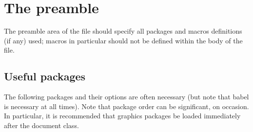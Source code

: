 \section{The preamble}

The preamble area of the file should specify all packages and macros
definitions (if any) used; macros in particular should not be defined
within the body of the file.


\subsection{Useful packages}

The following packages and their options are often necessary (but note
that \textsf{babel} is necessary at all times). Note that package
order can be significant, on occasion. In particular, it is
recommended that graphics packages be loaded immediately after the
document class.

